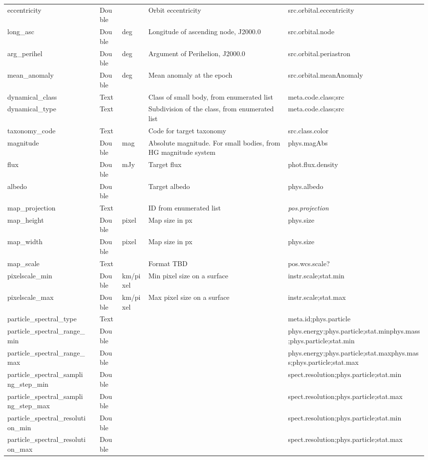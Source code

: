 \documentclass[11pt,a4paper]{ivoa}
\begin{document}
\begin{longtable}{p{3.5cm}p{0.5cm}p{1cm}p{1cm}p{7cm}p{3cm}}
eccentricity&&Double&&Orbit eccentricity&src.orbital.eccentricity\\
long\_asc&&Double&deg&Longitude of ascending node, J2000.0&src.orbital.node\\
arg\_perihel&&Double&deg&Argument of Perihelion, J2000.0&src.orbital.periastron\\
mean\_anomaly&&Double&deg&Mean anomaly at the epoch&src.orbital.meanAnomaly\\
dynamical\_class&&Text&&Class of small body, from enumerated list&meta.code.class;src\\
dynamical\_type&&Text&&Subdivision of the class, from enumerated list&meta.code.class;src\\
taxonomy\_code&&Text&&Code for target taxonomy&src.class.color\\
magnitude&&Double&mag&Absolute magnitude. For small bodies, from HG magnitude system&phys.magAbs\\
flux&&Double&mJy&Target flux&phot.flux.density\\
albedo&&Double&&Target albedo&phys.albedo\\
map\_projection&&Text&&ID from enumerated list&\emph{pos.projection}\\
map\_height&&Double&pixel&Map size in px&phys.size\\
map\_width&&Double&pixel&Map size in px&phys.size\\
map\_scale&&Text&&Format TBD&pos.wcs.scale?\\
pixelscale\_min&&Double&km/pixel&Min pixel size on a surface&instr.scale;stat.min\\
pixelscale\_max&&Double&km/pixel&Max pixel size on a surface&instr.scale;stat.max\\
particle\_spectral\_type&&Text&&&meta.id;phys.particle\\
particle\_spectral\_range\_min&&Double&&&phys.energy;phys.particle;stat.minphys.mass;phys.particle;stat.min\\
particle\_spectral\_range\_max&&Double&&&phys.energy;phys.particle;stat.maxphys.mass;phys.particle;stat.max\\
particle\_spectral\_sampling\_step\_min&&Double&&&spect.resolution;phys.particle;stat.min \\
particle\_spectral\_sampling\_step\_max&&Double&&&spect.resolution;phys.particle;stat.max \\
particle\_spectral\_resolution\_min&&Double&&&spect.resolution;phys.particle;stat.min \\
particle\_spectral\_resolution\_max&&Double&&&spect.resolution;phys.particle;stat.max \\

\end{longtable}
\end{document}
